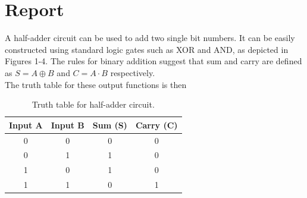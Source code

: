 \documentclass{article}
\begin{document}
	\section*{Report}
	
	A half-adder circuit can be used to add two single bit numbers. It can be easily constructed using standard logic gates such as XOR and AND, as depicted in Figures 1-4. The rules for binary addition suggest that sum and carry are defined as $S = A \oplus B$ and $C = A\cdot B$ respectively.\\
	
	The truth table for these output functions is then
	\begin{table}[H]
		\centering
		\begin{tabular}{|c|c|c|c|}
			\hline
			Input A & Input B & Sum (S) & Carry (C)\\
			\hline
			0 & 0 & 0 & 0\\
			0 & 1 & 1 & 0\\
			1 & 0 & 1 & 0\\
			1 & 1 & 0 & 1\\
			\hline
		\end{tabular}
		\caption{Truth table for half-adder circuit.}
	\end{table}
	
\end{document}
